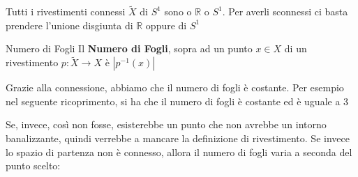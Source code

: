 \documentclass[11pt, a4paper, twoside]{article}
\begin{document}
\begin{oss}
	Tutti i rivestimenti connessi $\tilde X$ di $S^1$ sono o $\mathbb R$ o $S^1$. Per averli sconnessi ci basta prendere l'unione disgiunta di $\mathbb R$ oppure di $S^1$
\end{oss}

\begin{defn}{Numero di Fogli}{}
	Il \textbf{Numero di Fogli}, sopra ad un punto $x \in X$ di un rivestimento $p:\tilde X \to X$ è $|p^{-1}(x)|$
\end{defn}

Grazie alla connessione, abbiamo che il numero di fogli è costante. Per esempio nel seguente ricoprimento, si ha che il numero di fogli è costante ed è uguale a $3$
\begin{center}
\end{center}
Se, invece, così non fosse, esisterebbe un punto che non avrebbe un intorno banalizzante, quindi verrebbe a mancare la definizione di rivestimento. Se invece lo spazio di partenza non è connesso, allora il numero di fogli varia a seconda del punto scelto:
\end{document}
